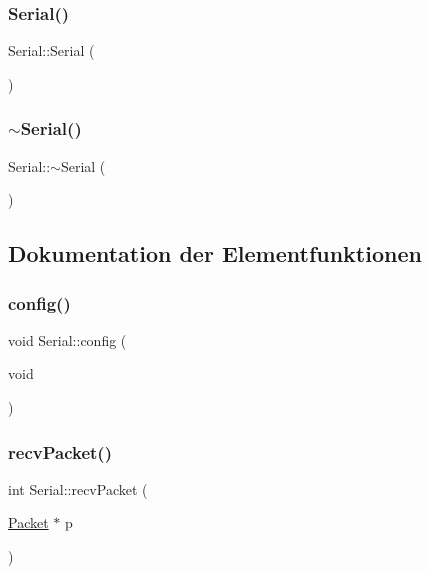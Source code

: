 \subsubsection{\texorpdfstring{Serial()}{Serial()}}
{\footnotesize\ttfamily Serial\+::\+Serial (\begin{DoxyParamCaption}{ }\end{DoxyParamCaption})}

\hypertarget{class_serial_a5b32c394c0ff923a4ef1c13cfb20a6ba}{}\label{class_serial_a5b32c394c0ff923a4ef1c13cfb20a6ba} 
\subsubsection{\texorpdfstring{$\sim$\+Serial()}{~Serial()}}
{\footnotesize\ttfamily Serial\+::$\sim$\+Serial (\begin{DoxyParamCaption}{ }\end{DoxyParamCaption})}



\subsection{Dokumentation der Elementfunktionen}
\hypertarget{class_serial_a50aa90466c7c87af0178cfd496da36be}{}\label{class_serial_a50aa90466c7c87af0178cfd496da36be} 
\subsubsection{\texorpdfstring{config()}{config()}}
{\footnotesize\ttfamily void Serial\+::config (\begin{DoxyParamCaption}\item[{void}]{ }\end{DoxyParamCaption})}

\hypertarget{class_serial_a357fce40e93f5a3700bfec09defd0bf9}{}\label{class_serial_a357fce40e93f5a3700bfec09defd0bf9} 
\subsubsection{\texorpdfstring{recv\+Packet()}{recvPacket()}}
{\footnotesize\ttfamily int Serial\+::recv\+Packet (\begin{DoxyParamCaption}\item[{\hyperlink{struct_packet}{Packet} $\ast$}]{p }\end{DoxyParamCaption})}

